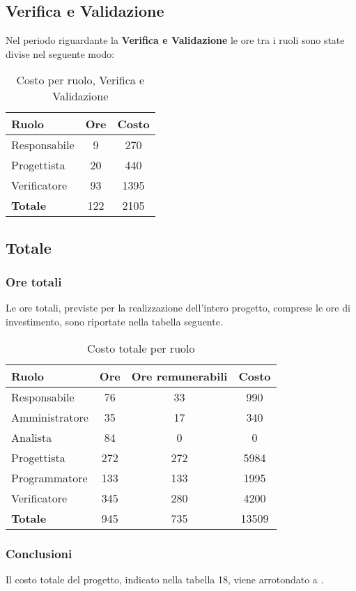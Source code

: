 \subsection{Verifica e Validazione}
Nel periodo riguardante la \textbf{Verifica e Validazione} le ore tra i ruoli sono state divise nel seguente modo:

\begin{table}[H]
	\begin{center}
		\begin{tabular}{|l|c|c|}
			\hline
			\textbf{Ruolo}	& \textbf{Ore} &	\textbf{Costo}	 \\
			\hline
			Responsabile	&	9	&	270		\\
			\hline
			Progettista		&	20	&	440		\\
			\hline
			Verificatore	&	93	&	1395	\\
			\hline
			\textbf{Totale}	&	122	&	2105	\\
			\hline
		\end{tabular}
	\end{center}
	\caption{Costo per ruolo, Verifica e Validazione}
\end{table}

\subsection{Totale}
\subsubsection{Ore totali}
Le ore totali, previste per la realizzazione dell'intero progetto, comprese le ore di investimento, sono riportate nella tabella seguente.

\begin{table}[H]
	\begin{center}
		\begin{tabular}{|l|c|c|c|}
			\hline
			\textbf{Ruolo}	& \textbf{Ore} &	\textbf{Ore remunerabili}	 &\textbf{Costo} \\
			\hline
			Responsabile	&	76	&	33	&	990	\\
			\hline
			Amministratore	&	35	&	17	&	340	\\
			\hline
			Analista		&	84	&	0	&	0	\\
			\hline
			Progettista		&	272	&	272	&	5984	\\
			\hline
			Programmatore	&	133	&	133	&	1995	\\
			\hline
			Verificatore	&	345	&	280	&	4200	\\
			\hline
			\textbf{Totale}	&	945	&	735	&	13509	\\
			\hline
		\end{tabular}
	\end{center}
	\caption{Costo totale per ruolo}
\end{table}

\subsubsection{Conclusioni}
Il costo totale del progetto, indicato nella tabella 18, viene arrotondato a .\\
